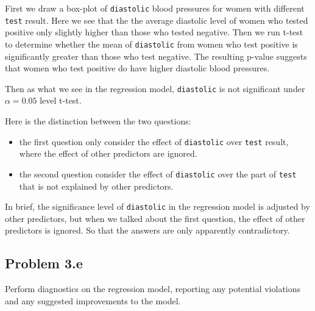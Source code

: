 \documentclass[12pt,oneside,a4paper]{article}\usepackage[]{graphicx}\usepackage[]{xcolor}
\newcommand{\subproblem}[1]
{
    \subsection*{Problem {#1}}
}
\newcommand{\m}[1]{\texttt{{#1}}}
\begin{document}
First we draw a box-plot of \m{diastolic} blood pressures for women with different \m{test} result. Here we see that the the average diastolic level of women who tested positive only slightly higher than those who tested negative. Then we run t-test to determine whether the mean of \m{diastolic} from women who test positive is significantly greater than those who test negative. The resulting p-value suggests that women who test positive do have higher diastolic blood pressures. 

Then as what we see in the regression model, \m{diastolic} is not significant under $\alpha = 0.05$ level t-test.

Here is the distinction between the two questions:
\begin{itemize}
    \item the first question only consider the effect of \m{diastolic} over \m{test} result, where the effect of other predictors are ignored.
    \item the second question consider the effect of \m{diastolic} over the part of \m{test} that is not explained by other predictors.
\end{itemize}

In brief, the significance level of \m{diastolic} in the regression model is adjusted by other predictors, but when we talked about the first question, the effect of other predictors is ignored. So that the answers are only apparently contradictory.

\subproblem{3.e}
Perform diagnostics on the regression model, reporting any potential violations and any suggested improvements to the model.
\end{document}
